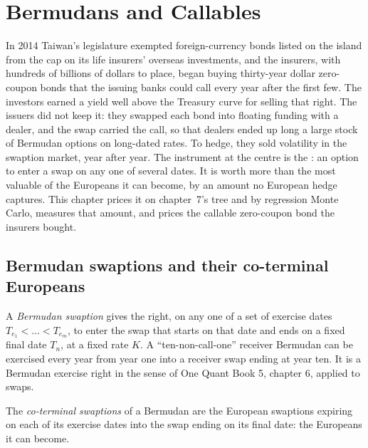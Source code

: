 \chapter{Bermudans and Callables}\label{ch:rc:bermudans-and-callables}

In 2014 Taiwan's legislature exempted foreign-currency bonds listed on the
island from the cap on its life insurers' overseas investments, and the
insurers, with hundreds of billions of dollars to place, began buying thirty-year
dollar zero-coupon bonds that the issuing banks could call every year after
the first few. The investors earned a yield well above the Treasury curve for
selling that right. The issuers did not keep it: they swapped each bond into
floating funding with a dealer, and the swap carried the call, so that dealers
ended up long a large stock of Bermudan options on long-dated rates. To hedge,
they sold volatility in the swaption market, year after year. The instrument at
the centre is the : an option to enter a swap on any one of
several dates. It is worth more than the most valuable of the Europeans it can
become, by an amount no European hedge captures. This chapter prices it on
chapter~7's tree and by regression Monte Carlo, measures that amount, and prices
the callable zero-coupon bond the insurers bought.

\section{Bermudan swaptions and their co-terminal Europeans}

\begin{definition}\label{def:rc:bermudans-and-callables:bermudan}
A \emph{Bermudan swaption} gives the right, on any one of
a set of exercise dates $T_{e_1}<\dots<T_{e_m}$, to enter the swap that starts on
that date and ends on a fixed final date $T_n$, at a fixed rate $K$. A
``ten-non-call-one'' receiver Bermudan can be exercised every year from year one
into a receiver swap ending at year ten. It is a Bermudan exercise right in the
sense of One Quant Book 5, chapter 6, applied to swaps.
\end{definition}

\begin{definition}\label{def:rc:bermudans-and-callables:coterminal}
The \emph{co-terminal swaptions} of a Bermudan are the
European swaptions expiring on each of its exercise dates into the swap ending on
its final date: the Europeans it can become.
\end{definition}

